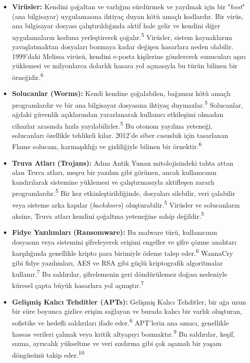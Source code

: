 \begin{itemize}
    \item \textbf{Virüsler:} Kendini çoğaltan ve varlığını sürdürmek ve yayılmak için bir "\textit{host}" (ana bilgisayar) uygulamasına ihtiyaç duyan kötü amaçlı kodlardır. Bir virüs, ana bilgisayar dosyası çalıştırıldığında aktif hale gelir ve kendini diğer uygulamaların koduna yerleştirerek çoğalır.\textsuperscript{5} Virüsler, sistem kaynaklarını yavaşlatmaktan dosyaları bozmaya kadar değişen hasarlara neden olabilir. 1999'daki Melissa virüsü, kendini e-posta kişilerine göndererek sunucuları aşırı yüklemesi ve milyonlarca dolarlık hasara yol açmasıyla bu türün bilinen bir örneğidir.\textsuperscript{6}
    \item \textbf{Solucanlar (Worms):} Kendi kendine çoğalabilen, bağımsız kötü amaçlı programlardır ve bir ana bilgisayar dosyasına ihtiyaç duymazlar.\textsuperscript{5} Solucanlar, ağdaki güvenlik açıklarından yararlanarak kullanıcı etkileşimi olmadan cihazlar arasında hızla yayılabilirler.\textsuperscript{5} Bu otonom yayılma yeteneği, solucanları özellikle tehlikeli kılar. 2012'de siber casusluk için tasarlanan Flame solucanı, karmaşıklığı ve gizliliğiyle bilinen bir örnektir.\textsuperscript{6}
    \item \textbf{Truva Atları (Trojans):} Adını Antik Yunan mitolojisindeki tahta attan alan Truva atları, meşru bir yazılım gibi görünen, ancak kullanıcının kandırılarak sistemine yüklemesi ve çalıştırmasıyla aktifleşen zararlı programlardır.\textsuperscript{5} Bir kez etkinleştirildiğinde, dosyaları silebilir, veri çalabilir veya sisteme arka kapılar (\textit{backdoors}) oluşturabilir.\textsuperscript{5} Virüsler ve solucanların aksine, Truva atları kendini çoğaltma yeteneğine sahip değildir.\textsuperscript{5}
    \item \textbf{Fidye Yazılımları (Ransomware):} Bu malware türü, kullanıcının dosyasını veya sistemini şifreleyerek erişimi engeller ve şifre çözme anahtarı karşılığında genellikle kripto para birimiyle ödeme talep eder.\textsuperscript{6} WannaCry gibi fidye yazılımları, AES ve RSA gibi güçlü kriptografik algoritmalar kullanır.\textsuperscript{7} Bu saldırılar, şifrelemenin geri döndürülemez doğası nedeniyle küresel çapta büyük hasarlara yol açmıştır.\textsuperscript{7}
    \item \textbf{Gelişmiş Kalıcı Tehditler (APTs):} Gelişmiş Kalıcı Tehditler, bir ağa uzun bir süre boyunca gizlice erişim sağlayan ve burada kalıcı bir varlık oluşturan, sofistike ve hedefli saldırıları ifade eder.\textsuperscript{6} APT'lerin ana amacı, genellikle hassas verileri çalmak veya kritik altyapıyı bozmaktır.\textsuperscript{9} Bu saldırılar, keşif, sızma, ayrıcalık yükseltme ve veri sızdırma gibi çok aşamalı bir yaşam döngüsünü takip eder.\textsuperscript{10}
\end{itemize}

